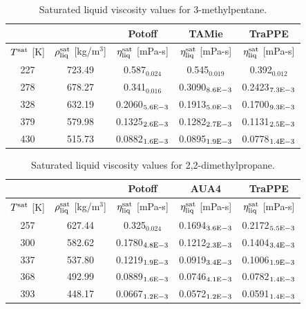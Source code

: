 \documentclass[preprint,review,11pt]{elsarticle}
\begin{document}
	\begin{table}[H]
		\caption{Saturated liquid viscosity values for 3-methylpentane.}
		\begin{center}
			\begin{tabular}{|c|c|c|c|c|}
				\hline
				&                                       & Potoff            & TAMie             & TraPPE            \\ \hline
				$T^{\rm sat}$ {[}K{]} & $\rho^{\rm sat}_{\rm liq}$ [kg/m$^3$] & $\eta_{\rm liq}^{\rm sat}$ {[}mPa-s{]} & $\eta_{\rm liq}^{\rm sat}$ {[}mPa-s{]} & $\eta_{\rm liq}^{\rm sat}$ {[}mPa-s{]} \\ \hline
				227 & 723.49 & 0.587$_{0.024}$   & 0.545$_{0.019}$   & 0.392$_{0.012}$   \\ \hline
				278 & 678.27 & 0.341$_{0.016}$   & 0.3090$_{8.6 \rm E-3}$ & 0.2423$_{7.3 \rm E-3}$ \\ \hline
				328 & 632.19 & 0.2060$_{5.6 \rm E-3}$ & 0.1913$_{5.0 \rm E-3}$ & 0.1700$_{9.3 \rm E-3}$ \\ \hline
				379 & 579.98 & 0.1325$_{2.6 \rm E-3}$ & 0.1282$_{2.7 \rm E-3}$ & 0.1131$_{2.5 \rm E-3}$ \\ \hline
				430 & 515.73 & 0.0882$_{1.6 \rm E-3}$ & 0.0895$_{1.9 \rm E-3}$ & 0.0778$_{1.4 \rm E-3}$ \\ \hline
			\end{tabular}
		\end{center}
	\end{table}
	
	\begin{table}[H]
		\caption{Saturated liquid viscosity values for 2,2-dimethylpropane.}
		\begin{center}
			\begin{tabular}{|c|c|c|c|c|}
				\hline
				&                                       & Potoff            & AUA4             & TraPPE            \\ \hline
				$T^{\rm sat}$ {[}K{]} & $\rho^{\rm sat}_{\rm liq}$ [kg/m$^3$] & $\eta_{\rm liq}^{\rm sat}$ {[}mPa-s{]} & $\eta_{\rm liq}^{\rm sat}$ {[}mPa-s{]} & $\eta_{\rm liq}^{\rm sat}$ {[}mPa-s{]} \\ \hline
				257 & 627.44 & 0.325$_{0.024}$   & 0.1694$_{3.6 \rm E-3}$ & 0.2172$_{5.5 \rm E-3}$ \\ \hline
				300 & 582.62 & 0.1780$_{4.8 \rm E-3}$ & 0.1212$_{2.3 \rm E-3}$ & 0.1404$_{3.4 \rm E-3}$ \\ \hline
				337 & 537.80 & 0.1219$_{1.9 \rm E-3}$ & 0.0919$_{3.4 \rm E-3}$ & 0.1006$_{1.9 \rm E-3}$ \\ \hline
				368 & 492.99 & 0.0889$_{1.6 \rm E-3}$ & 0.0746$_{4.1 \rm E-3}$ & 0.0782$_{1.4 \rm E-3}$ \\ \hline
				393 & 448.17 & 0.0667$_{1.2 \rm E-3}$ & 0.0572$_{1.2 \rm E-3}$ & 0.0591$_{1.4 \rm E-3}$ \\ \hline	
			\end{tabular}
		\end{center}
	\end{table}
	
\end{document}
